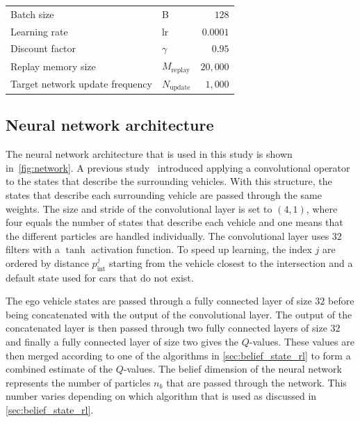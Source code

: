 \begin{table}[!bt]
\begin{tabular}{l l r}
		Batch size & B & $128$ \\
		Learning rate & lr & $0.0001$ \\
		Discount factor & $\gamma$ & $0.95$\\
		Replay memory size & $M_\mathrm{replay}$ & $20{,}000$\\
		Target network update frequency & $N_\mathrm{update}$ & $1{,}000$\\


		\bottomrule
	\end{tabular}
\end{table}


\subsection{Neural network architecture}
 The neural network architecture that is used in this study is shown in~\ref{fig:network}. A previous study~\cite{Hoel2018} introduced applying a convolutional operator to the states that describe the surrounding vehicles. With this structure, the states that describe each surrounding vehicle are passed through the same weights. The size and stride of the convolutional layer is set to $(4, 1)$, where four equals the number of states that describe each vehicle and one means that the different particles are handled individually. The convolutional layer uses \num{32} filters with a $\tanh$ activation function. To speed up learning, the index $j$ are ordered by distance $p^j_\mathrm{int}$ starting from the vehicle closest to the intersection and a default state used for cars that do not exist. 

The ego vehicle states are passed through a fully connected layer of size $32$ before being concatenated with the output of the convolutional layer. The output of the concatenated layer is then passed through two fully connected layers of size $32$ and finally a fully connected layer of size two gives the $Q$-values. These values are then merged according to one of the algorithms in \ref{sec:belief_state_rl} to form a combined estimate of the $Q$-values. The belief dimension of the neural network represents the number of particles $n_b$ that are passed through the network. This number varies depending on which algorithm that is used as discussed in \ref{sec:belief_state_rl}.


